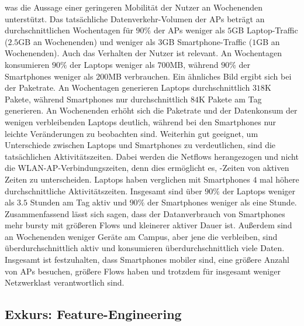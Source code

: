 \documentclass[12pt, a4paper]{article}
\begin{document}
was die Aussage einer geringeren Mobilität der Nutzer an Wochenenden unterstützt. \cite{Alipour2018}
Das tatsächliche Datenverkehr-Volumen der APs beträgt an durchschnittlichen Wochentagen für $90 \%$ der APs
weniger als $5$\textsc{GB} Laptop-Traffic ($2.5$\textsc{GB} an Wochenenden) und weniger als $3$\textsc{GB} Smartphone-Traffic
($1$\textsc{GB} an Wochenenden).
Auch das Verhalten der Nutzer ist relevant. An Wochentagen konsumieren $90 \%$ der Laptops weniger als $700$\textsc{MB},
während $90 \%$ der Smartphones weniger als $200$\textsc{MB} verbrauchen.
Ein ähnliches Bild ergibt sich bei der Paketrate. An Wochentagen generieren Laptops durchschnittlich $318$\textsc{K} Pakete, 
während Smartphones nur durchschnittlich $84$\textsc{K} Pakete am Tag generieren. 
An Wochenenden erhöht sich die Paketrate und der Datenkonsum der wenigen verbleibenden Laptops deutlich,
während bei den Smartphones nur leichte Veränderungen zu beobachten sind.
Weiterhin gut geeignet, um Unterschiede zwischen Laptops und Smartphones zu verdeutlichen, sind die tatsächlichen Aktivitätszeiten.
Dabei werden die Netflows herangezogen und nicht die WLAN-AP-Verbindungszeiten, denn dies ermöglicht es, -Zeiten
von aktiven Zeiten zu unterscheiden. Laptops haben verglichen mit Smartphones $4$ mal höhere durchschnittliche Aktivitätszeiten.
Insgesamt sind über $90 \%$ der Laptops weniger als $3.5$ Stunden am Tag aktiv und $90 \%$ der Smartphones weniger als eine Stunde.\newline
Zusammenfassend lässt sich sagen, dass der Datanverbrauch von Smartphones mehr bursty mit größeren Flows und kleinerer aktiver
Dauer ist. Außerdem sind an Wochenenden weniger Geräte am Campus, aber jene die verbleiben, sind überdurchschnittlich aktiv 
und konsumieren überdurchschnittlich viele Daten. Insgesamt ist festzuhalten, dass Smartphones mobiler sind, 
eine größere Anzahl von APs besuchen, größere Flows haben und trotzdem für insgesamt weniger Netzwerklast verantwortlich sind.

\subsection{Exkurs: Feature-Engineering}
\label{sec:digression}
\end{document}
